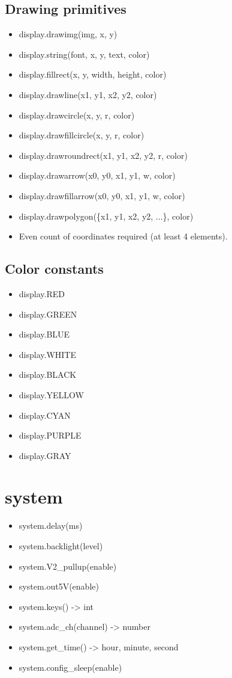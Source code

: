 \subsection{Drawing primitives}
\begin{itemize}
\item display.drawimg(img, x, y)
\item display.string(font, x, y, text, color)
\item display.fillrect(x, y, width, height, color)
\item display.drawline(x1, y1, x2, y2, color)
\item display.drawcircle(x, y, r, color)
\item display.drawfillcircle(x, y, r, color)
\item display.drawroundrect(x1, y1, x2, y2, r, color)
\item display.drawarrow(x0, y0, x1, y1, w, color)
\item display.drawfillarrow(x0, y0, x1, y1, w, color)
\item display.drawpolygon(\{x1, y1, x2, y2, ...\}, color)
\end{itemize}
\begin{itemize}
\item Even count of coordinates required (at least 4 elements).
\end{itemize}
\subsection{Color constants}
\begin{itemize}
\item display.RED
\item display.GREEN
\item display.BLUE
\item display.WHITE
\item display.BLACK
\item display.YELLOW
\item display.CYAN
\item display.PURPLE
\item display.GRAY
\end{itemize}
\section{system}
\begin{itemize}
\item system.delay(ms)
\item system.backlight(level)
\item system.V2\_pullup(enable)
\item system.out5V(enable)
\item system.keys() -> int
\item system.adc\_ch(channel) -> number
\item system.get\_time() -> hour, minute, second
\item system.config\_sleep(enable)
\end{itemize}
